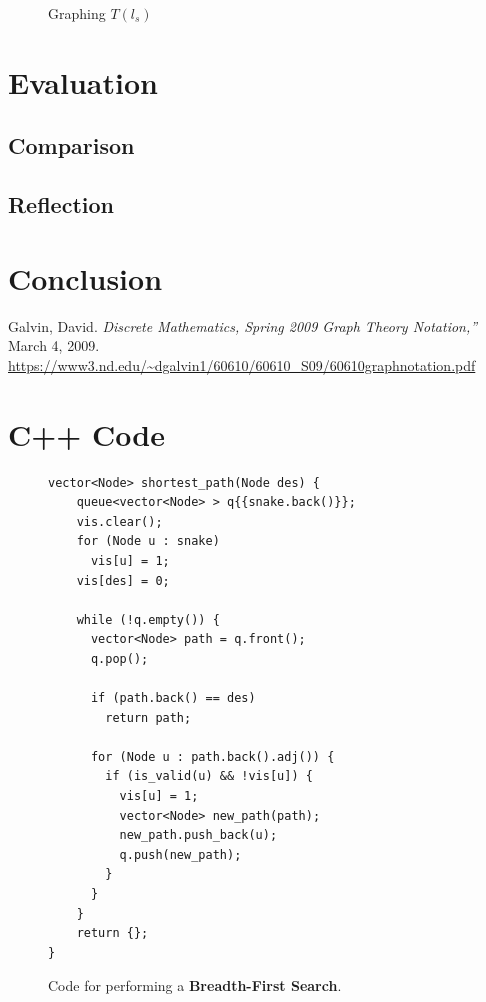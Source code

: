 \documentclass[12pt]{article}
\begin{document}
\begin{figure}[!h]
\centering
	\caption{Graphing $T(l_s)$}
	\label{fig:T_l_final_graph}
\end{figure}

\section{Evaluation}

\subsection{Comparison}

\subsection{Reflection}

\section{Conclusion}

\pagebreak
\begin{thebibliography}{9}
Galvin, David. \textit{Discrete Mathematics, Spring 2009 Graph Theory Notation,”} March 4, 2009. \url{https://www3.nd.edu/~dgalvin1/60610/60610_S09/60610graphnotation.pdf}
\end{thebibliography}

\pagebreak
\appendix
\section{C++ Code}\label{sec:appendix_code}

\begin{figure}[!h]
\centering
\begin{lstlisting}
vector<Node> shortest_path(Node des) {
    queue<vector<Node> > q{{snake.back()}};
    vis.clear();
    for (Node u : snake)
      vis[u] = 1;
    vis[des] = 0;
    
    while (!q.empty()) {
      vector<Node> path = q.front();
      q.pop();
     
      if (path.back() == des)
        return path;
        
      for (Node u : path.back().adj()) {
        if (is_valid(u) && !vis[u]) {
          vis[u] = 1;
          vector<Node> new_path(path);
          new_path.push_back(u);
          q.push(new_path);
        }
      }
    }
    return {};
}
\end{lstlisting}
\caption{Code for performing a \textbf{Breadth-First Search}.}
\label{fig:bfs_code}
\end{figure}
\end{document}
